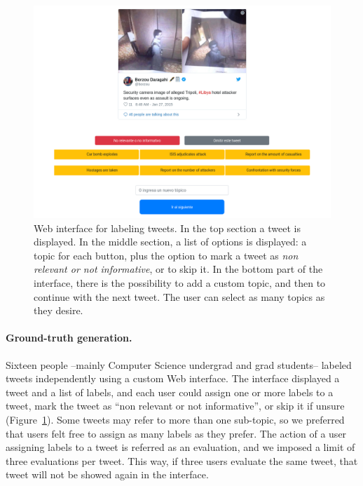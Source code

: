 
\begin{figure}[t]
    \centering
    \includegraphics[width=.8\textwidth]{figures/url-model/label.png}
    \caption[Web interface for labeling tweets.]
    {Web interface for labeling tweets. In the top section a tweet is displayed.
    In the middle section, a list of options is displayed: a topic for each
    button, plus the option to mark a tweet as {\it non relevant or not
    informative}, or to skip it. In the bottom part of the interface, there is
    the possibility to add a custom topic, and then to continue with the next
    tweet. The user can select as many topics as they desire.}\label{fig:gt-web} \end{figure}%

\paragraph{Ground-truth generation.}
%
Sixteen people --mainly Computer Science undergrad and grad students-- labeled
tweets independently using a custom Web interface.
%
The interface displayed a tweet and a list of labels, and each user could assign
one or more labels to a tweet, mark the tweet as ``non relevant or not
informative'', or skip it if unsure (Figure~\ref{fig:gt-web}).
%
Some tweets may refer to more than one sub-topic, so we preferred that users
felt free to assign as many labels as they prefer.
%
The action of a user assigning labels to a tweet is referred as an evaluation,
and we imposed a limit of three evaluations per tweet.
%
This way, if three users evaluate the same tweet, that tweet will not be showed
again in the interface.


